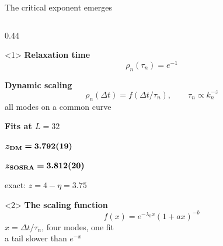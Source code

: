 \documentclass[11pt,t]{beamer}
\newcommand{\kb}[1]{{\bfseries\color{Kleinblue} #1}}
\begin{document}
\begin{frame}{The critical exponent emerges}
  \begin{columns}[T]
    \begin{column}{0.44\textwidth}
      \begin{onlyenv}<1>
      \kb{Relaxation time}
      \small
      \begin{equation*}
        \rho_n(\tau_n)=e^{-1}
      \end{equation*}

      \kb{Dynamic scaling}
      \begin{equation*}
        \rho_n(\Delta t)=f(\Delta t/\tau_n),\qquad
        \tau_n\propto k_n^{-z}
      \end{equation*}
      all modes on a common curve

      \kb{Fits at $L=32$}

      \alert{$\bm{z_{\rm DM}=3.792(19)}$}

      \alert{$\bm{z_{\rm SOSRA}=3.812(20)}$}

      exact: $z=4-\eta=3.75$
      \end{onlyenv}
      \begin{onlyenv}<2>
      \kb{The scaling function}
      \small
      \begin{equation*}
        f(x)=e^{-\lambda_0x}(1+ax)^{-b}
      \end{equation*}
      \footnotesize
      $x=\Delta t/\tau_n$, four modes, one fit\\
      a tail slower than $e^{-x}$


\end{onlyenv}
\end{column}
\end{columns}
\end{frame}
\end{document}
